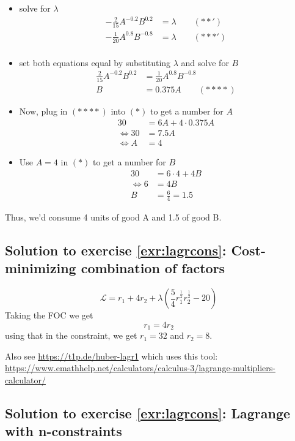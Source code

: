\documentclass[
  12pt,
  oneside]{book}
\providecommand{\tightlist}{%
  \setlength{\itemsep}{0pt}\setlength{\parskip}{0pt}}
\theoremstyle{definition}
\theoremstyle{definition}
\theoremstyle{definition}
\theoremstyle{definition}
\theoremstyle{remark}
\begin{document}
\begin{itemize}
\tightlist
\item
  solve for \(\lambda\)
  \begin{align*}
    -\frac{2}{15} A^{-0.2}B^{0.2}&=\lambda \qquad (**')\\
        -\frac{1}{20} A^{0.8}B^{-0.8}&=\lambda \qquad (***')\\
  \end{align*}
\item
  set both equations equal by substituting \(\lambda\) and solve for \(B\)
  \begin{align*}
    \frac{2}{15} A^{-0.2}B^{0.2}&=  \frac{1}{20} A^{0.8}B^{-0.8}\\
    B&=0.375A \qquad (****) %
  \end{align*}
\item
  Now, plug in \((****)\) into \((*)\) to get a number for \(A\)
  \begin{align*}
    30&=6A+4\cdot 0.375 A\\
    \Leftrightarrow 30&=7.5A\\
    \Leftrightarrow A&=4
  \end{align*}
\item
  Use \(A=4\) in \((*)\) to get a number for \(B\)
  \begin{align*}
    30&=6\cdot 4+4 B\\
    \Leftrightarrow 6&=4B\\
    B&=\frac{6}{4}=1.5
  \end{align*}
\end{itemize}

Thus, we'd consume 4 units of good A and 1.5 of good B.

\hypertarget{sol:costmin}{%
\subsection*{Solution to exercise \ref{exr:lagrcons}: Cost-minimizing combination of factors}\label{sol:costmin}}

\[
\mathcal{L}=r_1+4r_2+\lambda\left(\frac{5}{4}r_1^{\frac{1}{2}}r_2^{\frac{1}{2}}-20\right)
\]
Taking the FOC we get
\[r_1=4r_2\] using that in the constraint, we get \(r_1=32\) and \(r_2=8\).

Also see \url{https://t1p.de/huber-lagr1} which uses this tool: \url{https://www.emathhelp.net/calculators/calculus-3/lagrange-multipliers-calculator/}

\hypertarget{sol:lagrcons}{%
\subsection*{Solution to exercise \ref{exr:lagrcons}: Lagrange with n-constraints}\label{sol:lagrcons}}
\end{document}
